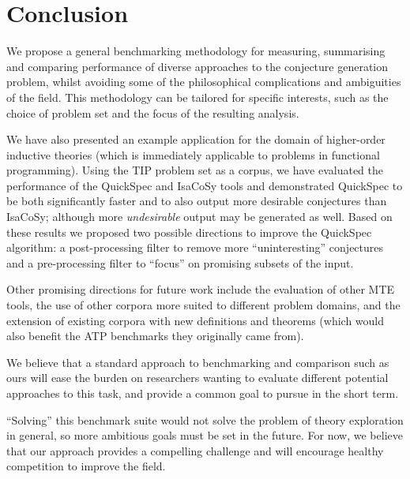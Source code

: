 \section{Conclusion}
\label{sec:conclusion}

We propose a general benchmarking methodology for measuring, summarising and
comparing performance of diverse approaches to the conjecture generation
problem, whilst avoiding some of the philosophical complications and ambiguities
of the field. This methodology can be tailored for specific interests, such as
the choice of problem set and the focus of the resulting analysis.

We have also presented an example application for the domain of higher-order
inductive theories (which is immediately applicable to problems in functional
programming). Using the TIP problem set as a corpus, we have evaluated the
performance of the QuickSpec and IsaCoSy tools and demonstrated QuickSpec to be
both significantly faster and to also output more desirable conjectures than
IsaCoSy; although more \emph{undesirable} output may be generated as well. Based
on these results we proposed two possible directions to improve the QuickSpec
algorithm: a post-processing filter to remove more ``uninteresting'' conjectures
and a pre-processing filter to ``focus'' on promising subsets of the input.

Other promising directions for future work include the evaluation of other MTE
tools, the use of other corpora more suited to different problem domains, and
the extension of existing corpora with new definitions and theorems (which would
also benefit the ATP benchmarks they originally came from).

We believe that a standard approach to benchmarking and comparison such as ours
will ease the burden on researchers wanting to evaluate different potential
approaches to this task, and provide a common goal to pursue in the short term.

``Solving'' this benchmark suite would not solve the problem of theory
exploration in general, so more ambitious goals must be set in the future. For
now, we believe that our approach provides a compelling challenge and will
encourage healthy competition to improve the field.






